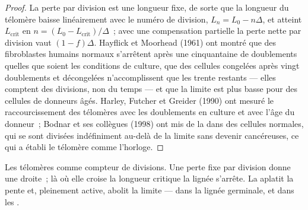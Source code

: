 \begin{proof}
La perte par division est une longueur fixe, de sorte que la longueur du
télomère baisse linéairement avec le numéro de division,
$L_{n} = L_{0} - n\Delta$, et atteint $L_{\text{crit}}$ en
$n = (L_{0} - L_{\text{crit}})/\Delta$~; avec une compensation partielle
la perte nette par division vaut $(1 - f)\Delta$. Hayflick et Moorhead
(1961) ont montré que des fibroblastes humains normaux s'arrêtent après
une cinquantaine de doublements quelles que soient les conditions de
culture, que des cellules congelées après vingt doublements et
décongelées n'accomplissent que les trente restants --- elles comptent
des divisions, non du temps --- et que la limite est plus basse pour des
cellules de donneurs âgés. Harley, Futcher et Greider (1990) ont mesuré
le raccourcissement des télomères avec les doublements en culture et
avec l'âge du donneur~; Bodnar et ses collègues (1998) ont mis de la
 dans des cellules normales, qui se sont divisées indéfiniment
au-delà de la limite sans devenir cancéreuses, ce qui a établi le
télomère comme l'horloge.
\end{proof}

\begin{omfigure}

{\small Les télomères comme compteur de divisions. Une perte fixe par
division donne une droite~; là où elle croise la longueur critique la
lignée s'arrête. La  aplatit la pente et, pleinement active,
abolit la limite --- dans la lignée germinale, et dans les .}
\end{omfigure}

